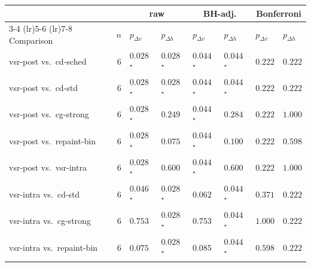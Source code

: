 \begin{tabular}{lr|ll|ll|ll}
\toprule
 & & \multicolumn{2}{c|}{raw} & \multicolumn{2}{c|}{BH-adj.} & \multicolumn{2}{c}{Bonferroni} \\
\cmidrule(lr){3-4} \cmidrule(lr){5-6} \cmidrule(lr){7-8}
Comparison & $n$ & $p_{\Delta v}$ & $p_{\Delta h}$ & $p_{\Delta v}$ & $p_{\Delta h}$ & $p_{\Delta v}$ & $p_{\Delta h}$ \\
\midrule
vsr-post vs.\ cd-sched & 6 & $0.028$\,$^{\star}$ & $0.028$\,$^{\star}$ & $0.044$\,$^{\star}$ & $0.044$\,$^{\star}$ & $0.222$ & $0.222$ \\
vsr-post vs.\ cd-std & 6 & $0.028$\,$^{\star}$ & $0.028$\,$^{\star}$ & $0.044$\,$^{\star}$ & $0.044$\,$^{\star}$ & $0.222$ & $0.222$ \\
vsr-post vs.\ cg-strong & 6 & $0.028$\,$^{\star}$ & $0.249$ & $0.044$\,$^{\star}$ & $0.284$ & $0.222$ & $1.000$ \\
vsr-post vs.\ repaint-bin & 6 & $0.028$\,$^{\star}$ & $0.075$ & $0.044$\,$^{\star}$ & $0.100$ & $0.222$ & $0.598$ \\
vsr-post vs.\ vsr-intra & 6 & $0.028$\,$^{\star}$ & $0.600$ & $0.044$\,$^{\star}$ & $0.600$ & $0.222$ & $1.000$ \\
vsr-intra vs.\ cd-std & 6 & $0.046$\,$^{\star}$ & $0.028$\,$^{\star}$ & $0.062$ & $0.044$\,$^{\star}$ & $0.371$ & $0.222$ \\
vsr-intra vs.\ cg-strong & 6 & $0.753$ & $0.028$\,$^{\star}$ & $0.753$ & $0.044$\,$^{\star}$ & $1.000$ & $0.222$ \\
vsr-intra vs.\ repaint-bin & 6 & $0.075$ & $0.028$\,$^{\star}$ & $0.085$ & $0.044$\,$^{\star}$ & $0.598$ & $0.222$ \\
\bottomrule
\end{tabular}
